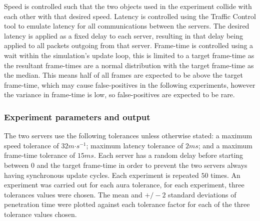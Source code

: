 Speed is controlled such that the two objects used in the experiment collide with each other with that desired speed. Latency is controlled using the Traffic Control tool to emulate latency for all communications between the servers. The desired latency is applied as a fixed delay to each server, resulting in that delay being applied to all packets outgoing from that server. Frame-time is controlled using a wait within the simulation's update loop, this is limited to a target frame-time as the resultant frame-times are a normal distribution with the target frame-time as the median. This means half of all frames are expected to be above the target frame-time, which may cause false-positives in the following experiments, however the variance in frame-time is low, so false-positives are expected to be rare. 


\subsubsection{Experiment parameters and output}
The two servers use the following tolerances unless otherwise stated: a maximum speed tolerance of $32m\mathord{\cdot}s^{-1}$; maximum latency tolerance of $2ms$; and a maximum frame-time tolerance of $15ms$. Each server has a random delay before starting between $0$ and the target frame-time in order to prevent the two servers always having synchronous update cycles. Each experiment is repeated $50$ times. An experiment was carried out for each aura tolerance, for each experiment, three tolerances values were chosen. The mean and $+/-2$ standard deviations of penetration time were plotted against each tolerance factor for each of the three tolerance values chosen.


